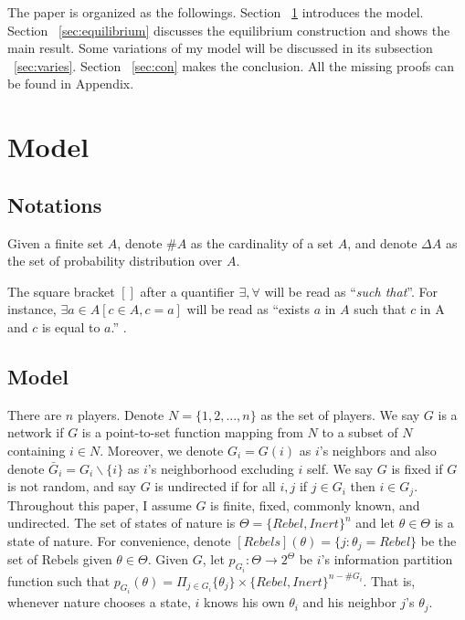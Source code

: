 \documentclass[12pt,letter]{article}
\theoremstyle{definition}
\theoremstyle{remark}
\theoremstyle{claim}
\begin{document}
The paper is organized as the followings. Section ~\ref{sec:model} introduces the model. Section ~\ref{sec:equilibrium} discusses the equilibrium construction and shows the main result. Some variations of my model will be discussed in its subsection ~\ref{sec:varies}. Section ~\ref{sec:con} makes the conclusion. All the missing proofs can be found in Appendix.

\section{Model}
\label{sec:model}
\subsection{Notations}
Given a finite set $A$, denote $\#A$ as the cardinality of a set $A$, and denote $\Delta A$ as the set of probability distribution over $A$. 

The square bracket $[]$ after a quantifier $\exists, \forall$ will be read as ``\textit{such that}''. For instance, $\exists a \in A [c\in A, c=a]$ will be read as ``exists $a$ in $A$ such that $c$ in A and $c$ is equal to $a$.'' .
\subsection{Model}


There are $n$ players. Denote $N=\{1,2,...,n\}$ as the set of players.  We say $G$ is a network if $G$ is a point-to-set function mapping from $N$ to a subset of $N$ containing $i\in N$. Moreover, we denote $G_i=G(i)$ as $i$'s neighbors and also denote $\bar{G}_i=G_i\backslash \{i\}$ as $i$'s neighborhood excluding $i$ self. We say $G$ is fixed if $G$ is not random, and say $G$ is undirected if for all $i,j$ if $j\in G_i$ then $i\in G_j$. Throughout this paper, I assume $G$ is finite, fixed, commonly known, and undirected. The set of states of nature is $\Theta=\{Rebel,Inert\}^n$ and let $\theta\in \Theta$ is a state of nature. For convenience, denote $[Rebels](\theta)=\{j:\theta_j=Rebel\}$ be the set of Rebels given $\theta\in \Theta$. Given $G$, let $p_{G_i}:\Theta \rightarrow 2^{\Theta}$ be $i$'s information partition function such that $p_{G_i}(\theta)=\Pi_{j\in G_i}\{\theta_j\}\times \{Rebel,Inert\}^{n-\#G_{i}}$. That is, whenever nature chooses a state, $i$ knows his own $\theta_i$ and his neighbor $j$'s $\theta_j$. 
\end{document}
